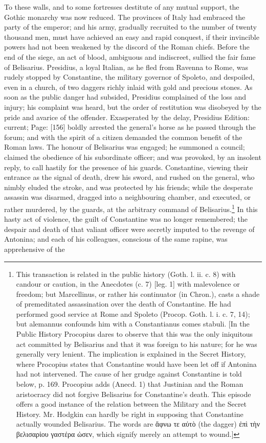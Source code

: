 To these walls, and to some fortresses destitute of any mutual support, the Gothic monarchy was now reduced. The provinces of Italy had embraced the party of the emperor; and his army, gradually recruited to the number of twenty thousand men, must have achieved an easy and rapid conquest, if their invincible powers had not been weakened by the discord of the Roman chiefs. Before the end of the siege, an act of blood, ambiguous and indiscreet, sullied the fair fame of Belisarius. Presidius, a loyal Italian, as he fled from Ravenna to Rome, was rudely stopped by Constantine, the military governor of Spoleto, and despoiled, even in a church, of two daggers richly inlaid with gold and precious stones. As soon as the public danger had subsided, Presidius complained of the loss and injury; his complaint was heard, but the order of restitution was disobeyed by the pride and avarice of the offender. Exasperated by the delay, Presidius Edition: current; Page: [156] boldly arrested the general\texthebrew{}’s horse as he passed through the forum; and with the spirit of a citizen demanded the common benefit of the Roman laws. The honour of Belisarius was engaged; he summoned a council; claimed the obedience of his subordinate officer; and was provoked, by an insolent reply, to call hastily for the presence of his guards. Constantine, viewing their entrance as the signal of death, drew his sword, and rushed on the general, who nimbly eluded the stroke, and was protected by his friends; while the desperate assassin was disarmed, dragged into a neighbouring chamber, and executed, or rather murdered, by the guards, at the arbitrary command of Belisarius.\footnote{This transaction is related in the public history (Goth. l. ii. c. 8) with candour or caution, in the Anecdotes (c. 7) [leg. 1] with malevolence or freedom; but Marcellinus, or rather his continuator (in Chron.), casts a shade of premeditated assassination over the death of Constantine. He had performed good service at Rome and Spoleto (Procop. Goth. l. i. c. 7, 14); but alemannus confounds him with a Constantianus comes stabuli. [In the Public History Procopius dares to observe that this was the only iniquitous act committed by Belisarius and that it was foreign to his nature; for he was generally very lenient. The implication is explained in the Secret History, where Procopius states that Constantine would have been let off if Antonina had not intervened. The cause of her grudge against Constantine is told below, p. 169. Procopius adds (Anecd. 1) that Justinian and the Roman aristocracy did not forgive Belisarius for Constantine\texthebrew{}’s death. This episode offers a good instance of the relation between the Military and the Secret History. Mr. Hodgkin can hardly be right in supposing that Constantine actually wounded Belisarius. The words are \textgreek{\texthebrew{ἄ}φνω τε α\texthebrew{ὐ}τ\texthebrew{ὸ}} (the dagger) \textgreek{\texthebrew{ἐ}π\texthebrew{ὶ} τ\texthebrew{ὴ}ν βελισαρ\texthebrew{ἰ}ου γαστέρα \texthebrew{ὠ}σεν}, which signify merely an attempt to wound.]} In this hasty act of violence, the guilt of Constantine was no longer remembered; the despair and death of that valiant officer were secretly imputed to the revenge of Antonina; and each of his colleagues, conscious of the same rapine, was apprehensive of the 